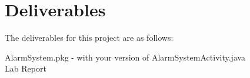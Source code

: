 \section{Deliverables}

The deliverables for this project are as follows:

	AlarmSystem.pkg - with your version of AlarmSystemActivity.java\\
\indent
	Lab Report